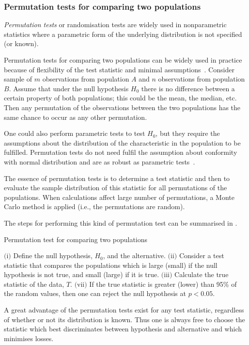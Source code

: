 \subsubsection{Permutation tests for comparing two populations}\label{ssec:perm-test-theory}
\nocite{Good2005}
\emph{Permutation tests} or randomisation tests are widely used in nonparametric statistics where a parametric form of the underlying distribution is not specified (or known).

Permutation tests for comparing two populations can be widely used in practice because of flexibility of the test statistic and minimal assumptions~\cite{Butar2008}. Consider sample of $m$ observations from population $A$ and $n$ observations from population $B$. Assume that under the null hypothesis $H_{0}$ there is no difference between a certain property of both populations; this could be the mean, the median, etc. Then any permutation of the observations between the two populations has the same chance to occur as any other permutation.

One could also perform parametric tests to test $H_{0}$, but they require the assumptions about the distribution of the characteristic in the population to be fulfilled. Permutation tests do not need fulfil the assumption about conformity with normal distribution and are as robust as parametric tests~\cite{Polko-Zajac2016}.

The essence of permutation tests is to determine a test statistic and then to evaluate the sample distribution of this statistic for all permutations of the populations. When calculations affect large number of permutations, a Monte Carlo method is applied (i.e., the permutations are random).

The steps for performing this kind of permutation test can be summarised in .

\newpage
\IncMargin{1em}
\begin{algorithm}[H]
	\caption{Permutation test for comparing two populations}
	\label{alg:perm-test-theory}
	\DontPrintSemicolon
	$\text{(i)}$ Define the null hypothesis, $H_{0}$, and the alternative.\;
	$\text{(ii)}$ Consider a test statistic that compares the populations which is large (small) if the null hypothesis is not true, and small (large) if it is true.\;
	$\text{(iii)}$ Calculate the true statistic of the data, $T$.\;
	$\text{(vii)}$ If the true statistic is greater (lower) than 95\% of the random values, then one can reject the null hypothesis at $p<0.05$.\;
\end{algorithm}
\DecMargin{1em}

A great advantage of the permutation tests exist for any test statistic, regardless of whether or not its distribution is known. Thus one is always free to choose the statistic which best discriminates between hypothesis and alternative and which minimises losses.
